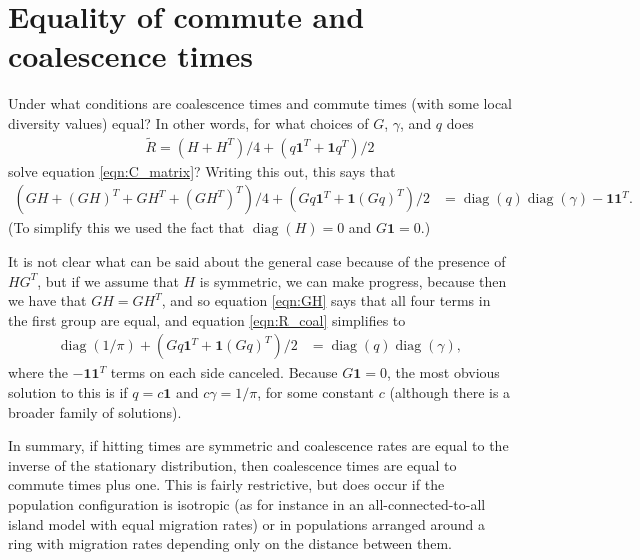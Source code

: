 \documentclass{article}
\newcommand{\comdist}{\widetilde{R}}
\DeclareMathOperator{\diag}{\mathop{\mbox{diag}}}
\newcommand{\bone}{\mathbf{1}}
\begin{document}
\section{Equality of commute and coalescence times}
\label{sec:com_eq_coal}

Under what conditions are coalescence times and commute times (with some local diversity values) equal?
In other words, for what choices of $G$, $\gamma$, and $q$ does
\begin{align}
    \comdist = (H + H^T)/4 + (q \bone^T + \bone q^T)/2
\end{align}
solve equation \eqref{eqn:C_matrix}?
Writing this out, this says that
\begin{align} \label{eqn:R_coal}
    ( GH + (GH)^T + GH^T + (GH^T)^T )/4 + (Gq \bone^T + \bone (Gq)^T)/2
    &=
    \diag(q) \diag(\gamma) - \bone \bone^T .
\end{align}
(To simplify this we used the fact that $\diag(H) = 0$ and $G\bone = 0$.)

It is not clear what can be said about the general case because of the presence of $HG^T$,
but if we assume that $H$ is symmetric, we can make progress,
because then we have that $GH = GH^T$, 
and so equation \eqref{eqn:GH} says that all four terms in the first group are equal,
and equation \eqref{eqn:R_coal} simplifies to
\begin{align} \label{eqn:R_eq_C}
    \diag(1/\pi) + (Gq \bone^T + \bone (Gq)^T)/2
    &=
    \diag(q) \diag(\gamma) ,
\end{align}
where the $-\bone \bone^T$ terms on each side canceled.
Because $G\bone=0$,
the most obvious solution to this is if $q = c \bone$ and $c \gamma = 1/\pi$, for some constant $c$
(although there is a broader family of solutions).

In summary, if hitting times are symmetric
and coalescence rates are equal to the inverse of the stationary distribution,
then coalescence times are equal to commute times plus one.
This is fairly restrictive, 
but does occur if the population configuration is isotropic
(as for instance in an all-connected-to-all island model with equal migration rates)
or in populations arranged around a ring
with migration rates depending only on the distance between them.
\end{document}
